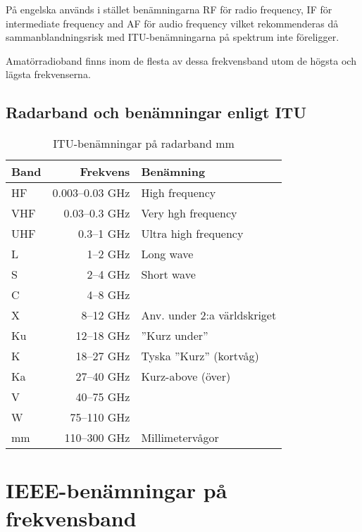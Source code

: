 På engelska används i stället be\-nämn\-ing\-ar\-na RF för radio frequency, IF
för intermediate frequency and AF för audio frequency vilket rekommenderas då
sammanblandningsrisk med ITU-be\-nämn\-ing\-ar\-na på spektrum inte
föreligger.

Amatörradioband finns inom de flesta av dessa frekvensband utom de högsta och
lägsta frekvenserna.

\subsection{Radarband och benämningar enligt ITU}

\begin{table}[H]
\centering

\begin{tabular}{lrl}
	\textbf{Band} & \textbf{Frekvens} & \textbf{Benämning}          \\ \hline
	HF            &   0.003--0.03 GHz & High frequency              \\
	VHF           &     0.03--0.3 GHz & Very hgh frequency          \\
	UHF           &        0.3--1 GHz & Ultra high frequency        \\
	L             &          1--2 GHz & Long wave                   \\
	S             &          2--4 GHz & Short wave                  \\
	C             &          4--8 GHz &  \\
	X             &         8--12 GHz & Anv. under 2:a världskriget \\
	Ku            &        12--18 GHz & ''Kurz under''              \\
	K             &        18--27 GHz & Tyska ''Kurz'' (kortvåg)    \\
	Ka            &        27--40 GHz & Kurz-above (över)           \\
	V             &        40--75 GHz &  \\
	W             &       75--110 GHz &  \\
	mm            &      110--300 GHz & Millimetervågor
\end{tabular}
\caption{ITU-benämningar på radarband mm}
\end{table}

\section{IEEE-benämningar på frekvensband}
\label{sec:IEEE-benamningar}

